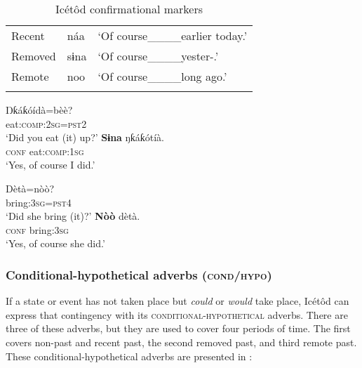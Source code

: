 \begin{table}
\caption{Icétôd confirmational markers}
\label{tab:adv:conf}


\begin{tabularx}{.66\textwidth}{XXl}
\lsptoprule

Recent & náa & ‘Of course\_\_\_\_earlier today.’\\
Removed & sɨna & ‘Of course\_\_\_\_yester-.’\\
Remote & noo & ‘Of course\_\_\_\_long ago.’\\
\lspbottomrule
\end{tabularx}
\end{table}



\ea\label{ex:adv:11}
  \ea
  \gll Ŋƙáƙóídà=bèè?  \\
eat:\textsc{comp:2sg=pst2}     \\
  \glt ‘Did you eat (it) up?’
  \ex
  \gll \textbf{Sɨna}   ŋƙáƙótíà.\\
\textsc{conf}   eat\textsc{:comp:1sg}    \\
  \glt ‘Yes, of course I did.’
  \z
\z





\ea\label{ex:adv:12}
  \ea
  \gll Dètà=nòò?      \\
bring:\textsc{3sg=pst4}    \\
  \glt ‘Did she bring (it)?’    
  \ex
  \gll \textbf{Nòò}   dètà.  \\
     \textsc{conf}   bring:\textsc{3sg}    \\
  \glt ‘Yes, of course she did.’
  \z
\z





\subsubsection{Conditional-hypothetical adverbs (\textsc{cond}/\textsc{hypo})}\label{sec:9.4.4}

If a state or event has not taken place but \textit{could} or \textit{would} take place, Icétôd can express that contingency with its \textsc{conditional-hypothetical} adverbs. There are three of these adverbs, but they are used to cover four periods of time. The first  covers non-past and recent past, the second removed past, and third remote past. These conditional-hypothetical adverbs are presented in :


